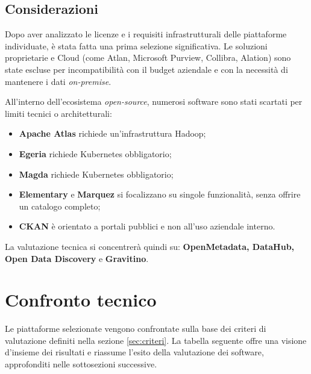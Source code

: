 \subsection*{Considerazioni}
Dopo aver analizzato le licenze e i requisiti infrastrutturali delle piattaforme individuate, è stata fatta una prima selezione significativa. Le soluzioni proprietarie e Cloud (come Atlan, Microsoft Purview, Collibra, Alation) 
sono state escluse per incompatibilità con il budget aziendale e con la necessità di mantenere i dati \emph{on-premise}.

All'interno dell'ecosistema \emph{open-source}, numerosi software sono stati scartati per limiti tecnici o architetturali:
\begin{itemize}
    \item \textbf{Apache Atlas} richiede un'infrastruttura Hadoop;
    \item \textbf{Egeria} richiede Kubernetes obbligatorio;
    \item \textbf{Magda} richiede Kubernetes obbligatorio;
    \item \textbf{Elementary} e \textbf{Marquez} si focalizzano su singole funzionalità, senza offrire un catalogo completo;
    \item \textbf{CKAN} è orientato a portali pubblici e non all'uso aziendale interno.
\end{itemize}
La valutazione tecnica si concentrerà quindi su: \textbf{OpenMetadata, DataHub, Open Data Discovery} e \textbf{Gravitino}.


\section{Confronto tecnico}
Le piattaforme selezionate vengono confrontate sulla base dei criteri di valutazione definiti nella sezione \ref{sec:criteri}. 
La tabella seguente offre una visione d'insieme dei risultati e riassume l'esito della valutazione dei software, approfonditi nelle sottosezioni successive.

